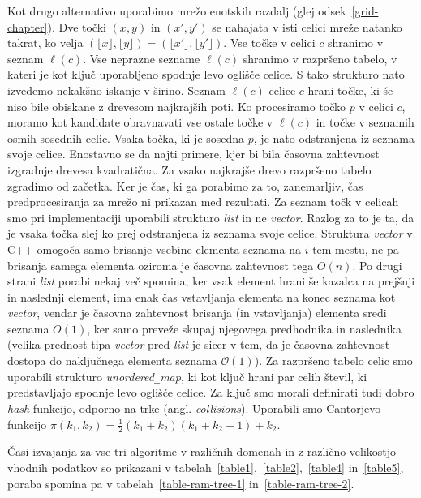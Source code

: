 \documentclass[a4paper, 12pt]{book}
\newcommand{\OO}{\ensuremath{\mathcal{O}}} %
\newcommand{\U}{\texttt{\_}}
\begin{document}
Kot drugo alternativo uporabimo mrežo enotskih razdalj (glej odsek~\ref{grid-chapter}). Dve točki $(x,y)$ in $(x',y')$ se nahajata v isti celici mreže natanko takrat, ko velja $(\lfloor x\rfloor ,\lfloor y\rfloor)=(\lfloor x'\rfloor ,\lfloor y'\rfloor)$. Vse točke v celici $c$ shranimo v seznam $\ell(c)$. Vse neprazne sezname $\ell(c)$ shranimo v razpršeno tabelo, v kateri je kot ključ uporabljeno spodnje levo oglišče celice. S tako strukturo nato izvedemo nekakšno iskanje v širino. Seznam $\ell(c)$ celice $c$ hrani točke, ki še niso bile obiskane z drevesom najkrajših poti. Ko procesiramo točko $p$ v celici $c$, moramo kot kandidate obravnavati vse ostale točke v $\ell(c)$ in točke v seznamih osmih sosednih celic. Vsaka točka, ki je sosedna $p$, je nato odstranjena iz seznama svoje celice. Enostavno se da najti primere, kjer bi bila časovna zahtevnost izgradnje drevesa kvadratična. Za vsako najkrajše drevo razpršeno tabelo zgradimo od začetka. Ker je čas, ki ga porabimo za to, zanemarljiv, čas predprocesiranja za mrežo ni prikazan med rezultati. Za seznam točk v celicah smo pri implementaciji uporabili strukturo \textit{list} in ne \textit{vector}. Razlog za to je ta, da je vsaka točka slej ko prej odstranjena iz seznama svoje celice. Struktura \textit{vector} v C++ omogoča samo brisanje vsebine elementa seznama na $i$-tem mestu, ne pa brisanja samega elementa oziroma je časovna zahtevnost tega $O(n)$. Po drugi strani \textit{list} porabi nekaj več spomina, ker vsak element hrani še kazalca na prejšnji in naslednji element, ima enak čas vstavljanja elementa na konec seznama kot \textit{vector}, vendar je časovna zahtevnost brisanja (in vstavljanja) elementa sredi seznama $O(1)$, ker samo preveže skupaj njegovega predhodnika in naslednika (velika prednost tipa \textit{vector} pred \textit{list} je sicer v tem, da je časovna zahtevnost dostopa do naključnega elementa seznama $\OO(1)$). Za razpršeno tabelo celic smo uporabili strukturo \textit{unordered\U map}, ki kot ključ hrani par celih števil, ki predstavljajo spodnje levo oglišče celice. Za ključ smo morali definirati tudi dobro \textit{hash} funkcijo, odporno na trke (angl. \textit{collisions}). Uporabili smo Cantorjevo funkcijo $\pi (k_1, k_2) = \frac{1}{2}(k_1+k_2)(k_1+k_2+1) + k_2$.

Časi izvajanja za vse tri algoritme v različnih domenah in z različno velikostjo vhodnih podatkov so prikazani v tabelah~\ref{table1},~\ref{table2},~\ref{table4} in~\ref{table5}, poraba spomina pa v tabelah~\ref{table-ram-tree-1} in~\ref{table-ram-tree-2}.
\end{document}
